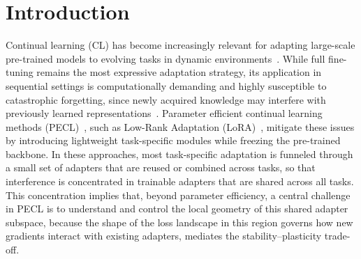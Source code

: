 \documentclass[10pt]{article} %
\newcommand\todo[1]{{\color{red} [TODO: #1]}}
\begin{document}
\section{Introduction}







Continual learning (CL) has become increasingly relevant for adapting large-scale pre-trained models to evolving tasks in dynamic environments~\cite{PARISI201954,10444954,a2923225ea7d94e6c86faff97e23c69be,10.1145/3735633}. 
While full fine-tuning remains the most expressive adaptation strategy, its application in sequential settings is computationally demanding and highly susceptible to catastrophic forgetting, since newly acquired knowledge may interfere with previously learned representations~\cite{howard2018universallanguagemodelfinetuning,doi:10.1073/pnas.1611835114,pmlr-v234-zhai24a,luo2025empiricalstudycatastrophicforgetting}.
Parameter efficient continual learning methods (PECL)~\cite{pmlr-v97-houlsby19a,dingParameterefficientFinetuningLargescale2023,He_2025_CVPR,NEURIPS2024_b0bc711f}, such as Low-Rank Adaptation (LoRA)~\cite{hu2022lora}, mitigate these issues by introducing lightweight task-specific modules while freezing the pre-trained backbone.
In these approaches, most task-specific adaptation is funneled through a small set of adapters that are reused or combined across tasks, so that interference is concentrated in trainable adapters that are shared across all tasks.
This concentration implies that, beyond parameter efficiency, a central challenge in PECL is to understand and control the local geometry of this shared adapter subspace, because the shape of the loss landscape in this region governs how new gradients interact with existing adapters, mediates the stability–plasticity trade-off.
\end{document}
